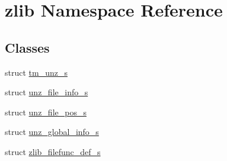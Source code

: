 \hypertarget{namespacezlib}{}\section{zlib Namespace Reference}
\label{namespacezlib}
\subsection*{Classes}
\begin{DoxyCompactItemize}
\item 
struct \hyperlink{structzlib_1_1tm__unz__s}{tm\+\_\+unz\+\_\+s}
\item 
struct \hyperlink{structzlib_1_1unz__file__info__s}{unz\+\_\+file\+\_\+info\+\_\+s}
\item 
struct \hyperlink{structzlib_1_1unz__file__pos__s}{unz\+\_\+file\+\_\+pos\+\_\+s}
\item 
struct \hyperlink{structzlib_1_1unz__global__info__s}{unz\+\_\+global\+\_\+info\+\_\+s}
\item 
struct \hyperlink{structzlib_1_1zlib__filefunc__def__s}{zlib\+\_\+filefunc\+\_\+def\+\_\+s}
\end{DoxyCompactItemize}
